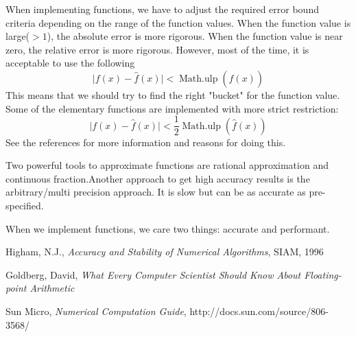 When implementing functions, we have to adjust the required error bound criteria depending on the range of the function values. When the function value is large($>1$), the absolute error is more rigorous. When the function value is near zero, the relative error is more rigorous. However, most of the time, it is acceptable to use the following 
\[ \big|f(x) - \hat{f}(x)\big| < \operatorname{Math.ulp}(\hat{f}(x)) \]
This means that we should try to find the right "bucket" for the function value. Some of the elementary functions are implemented with more strict restriction:
\[ \big|f(x) - \hat{f}(x)\big| < \frac{1}{2}\operatorname{Math.ulp}(\hat{f}(x)) \]
See the references for more information and reasons for doing this.
    
Two powerful tools to approximate functions are rational approximation and continuous fraction.Another approach to get high accuracy results is the arbitrary/multi precision approach. It is slow but can be as accurate as pre-specified.

When we implement functions, we care two things: accurate and performant.


\begin{thebibliography}{99}

 Higham, N.J., {\itshape Accuracy and Stability of Numerical Algorithms}, SIAM, 1996

 Goldberg, David, {\itshape What Every Computer Scientist Should Know About Floating-point Arithmetic}

 Sun Micro, {\itshape Numerical Computation Guide}, http://docs.sun.com/source/806-3568/



\end{thebibliography}

